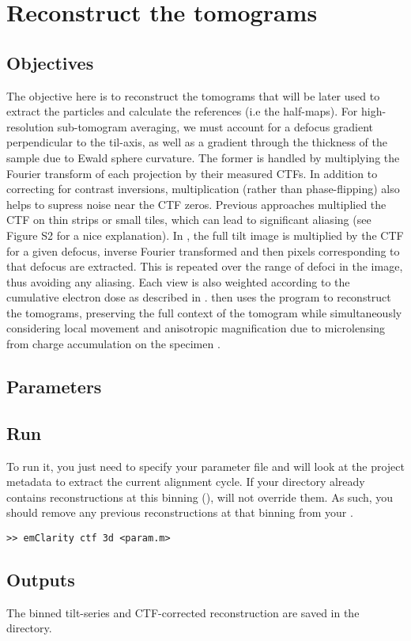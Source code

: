 \section{Reconstruct the tomograms} \label{sec:ctf_3d}

\subsection{Objectives}

The objective here is to reconstruct the tomograms that will be later used to extract the particles and calculate the references (i.e the half-maps). For high-resolution sub-tomogram averaging, we must account for a defocus gradient perpendicular to the til-axis, as well as a gradient through the thickness of the sample due to Ewald sphere curvature. The former is handled by multiplying the Fourier transform of each projection by their measured CTFs. In addition to correcting for contrast inversions, multiplication (rather than phase-flipping) also helps to supress noise near the CTF zeros. Previous approaches multiplied the CTF on thin strips or small tiles, which can lead to significant aliasing (see \cite{Tegunov2020} Figure S2 for a nice explanation). In {\emClarity}, the full tilt image is multiplied by the CTF for a given defocus, inverse Fourier transformed and then pixels corresponding to that defocus are extracted. This is repeated over the range of defoci in the image, thus avoiding any aliasing. Each view is also weighted according to the cumulative electron dose as described in \cite{exposure_grant_2015}. {\emClarity} then uses the {\IMOD} program {\tilt} to reconstruct the tomograms, preserving the full context of the tomogram while simultaneously considering local movement and anisotropic magnification due to microlensing from charge accumulation on the specimen \cite{MASTRONARDE2017102}.

\subsection{Parameters}

\newpage

\subsection{Run}

To run it, you just need to specify your parameter file and {\emClarity} will look at the project metadata to extract the current alignment cycle. If your  directory already contains reconstructions at this binning (), {\emClarity} will not override them. As such, you should remove any previous reconstructions at that binning from your .
\begin{lstlisting}
>> emClarity ctf 3d <param.m>
\end{lstlisting}

\subsection{Outputs}

The binned tilt-series and CTF-corrected reconstruction are saved in the  directory.